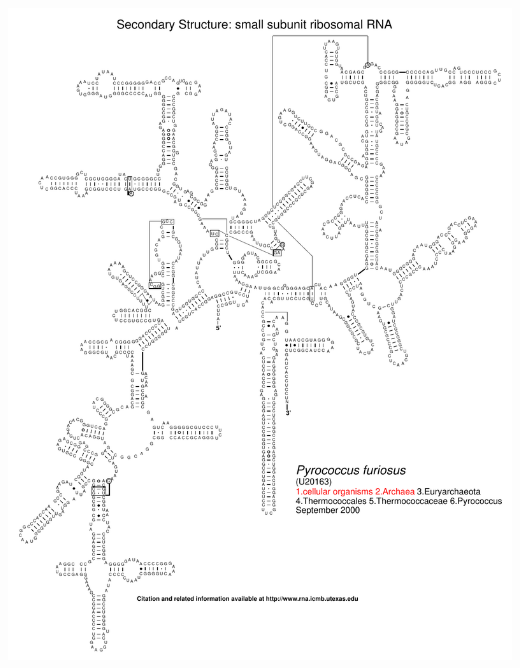 \documentclass[landscape]{slides}
\begin{document}
\begin{slide}\begin{center}\includegraphics[height=8in]{figs/arc-16}\end{center}\vfill\end{slide}
\end{document}
